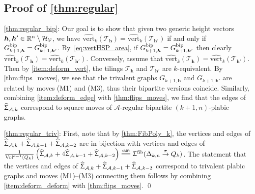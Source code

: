 \documentclass[11pt]{amsart}
\makeatletter
\newcommand{\itemrefperh@ps}[2]{\textup{#2}}
\newcommand{\itemref}[1]{\begingroup\let\perh@ps\itemrefperh@ps\ref{#1}\endgroup}
\theoremstyle{plain}
\theoremstyle{definition}
\def\A{\mathcal{A}}
\def\h{{\bm{h}}}
\def\Vol{\mathrm{Vol}}
\newcommand\wh[1]{\hstretch{2}{\hat{\hstretch{0.5}{#1}}}}
\def\vert{\mathrm{vert}}
\def\vertHSP{\wh\vert}
\def\vertHSP{\widehat{\vert}}
\def\HSP{\widehat\Upsigma}
\def\Sigma{\HSP}
\def\fiber{{\operatorname{fib}}}
\def\FibPoly{\Upsigma^\fiber}
\def\pito{\overset \pi \to}
\def\Tcal{\mathcal{T}}
\def\Tiling{\Tcal}
\newcommand\shifteq{\stackrel{\mathclap{\normalfont\mbox{\scalebox{0.6}{shift}}}}{=\joinrel=}}
\def\Voldd{\Vol^{d-1}}
\makeatother
\begin{document}
\def\GA{\bip G_{k+1,\h}}
\def\GB{\bip G_{k+1,\h'}}

\subsection{Proof of \cref{thm:regular}}
\itemref{thm:regular_bip}: Our goal is to show that given two generic height vectors $\h,\h'\in\GHV$, we have $\vertHSP_k(\Tiling_\h)=\vertHSP_k(\Tiling_{\h'})$ if and only if $\GA=\GB$. By~\eqref{eq:vertHSP_area}, if $\GA=\GB$ then clearly $\vertHSP_k(\Tiling_\h)=\vertHSP_k(\Tiling_{\h'})$.  Conversely, assume that $\vertHSP_k(\Tiling_\h)=\vertHSP_k(\Tiling_{\h'})$. Then by \cref{item:deform_vert}, the tilings $\Tiling_\h$ and $\Tiling_{\h'}$ are $k$-equivalent. By \cref{thm:flips_moves}, we see that the trivalent graphs $G_{k+1,\h}$ and $G_{k+1,\h'}$ are related by moves (M1) and (M3), thus their bipartite versions coincide. Similarly, combining \cref{item:deform_edge} with \cref{thm:flips_moves}, we find that the edges of $\Sigma_{\A,k}$ correspond to square moves of $\A$-regular bipartite $(k+1,n)$-plabic graphs.

\itemref{thm:regular_triv}: First, note that 
	by 
\cref{thm:FibPoly_k}, 
the vertices and edges of $\Sigma_{\A, k}+\Sigma_{\A, k-1} + \Sigma_{\A, k-2}$ are in bijection with vertices and edges of $\frac1{\Voldd(Q_k)} \left(\Sigma_{\A, k}+4\Sigma_{\A, k-1} + \Sigma_{\A, k-2}\right)\shifteq  \FibPoly(\Delta_{k,n}\pito Q_k)$.  The statement that the vertices and edges of $\Sigma_{\A, k}+\Sigma_{\A, k-1} + \Sigma_{\A, k-2}$ correspond to trivalent plabic graphs and moves (M1)--(M3) connecting them follows by combining \cref{item:deform_deform} with \cref{thm:flips_moves}. \qed
\end{document}

